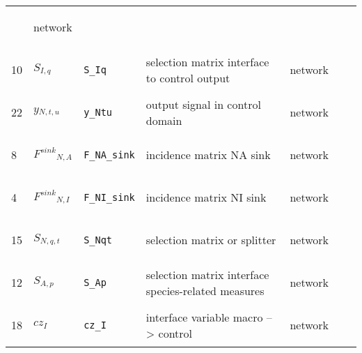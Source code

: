 \begin{longtable}{|p{1cm}|p{2.5cm}|p{4.5cm}|p{8cm}|p{3.0cm}|p{3cm}|p{1cm}|}
             & \begin{lay}network \end{lay}
             & $  $
             & \\
            10
             & \hypertarget{"v:10"}{ $ {{S}}{_{I, q}} $}
             & \verb|S_Iq|
             & selection matrix interface to control output
             & \begin{lay}network \end{lay}
             & $  $
             & \\
            22
             & \hypertarget{"v:22"}{ $ {{y}}{_{N, t, u}} $}
             & \verb|y_Ntu|
             & output signal in control domain
             & \begin{lay}network \end{lay}
             & $  $
             & \\
            8
             & \hypertarget{"v:8"}{ $ {{F^{sink}}}{_{N, A}} $}
             & \verb|F_NA_sink|
             & incidence matrix NA sink
             & \begin{lay}network \end{lay}
             & $  $
             & \\
            4
             & \hypertarget{"v:4"}{ $ {{F^{sink}}}{_{N, I}} $}
             & \verb|F_NI_sink|
             & incidence matrix NI sink
             & \begin{lay}network \end{lay}
             & $  $
             & \\
            15
             & \hypertarget{"v:15"}{ $ {{S}}{_{N, q, t}} $}
             & \verb|S_Nqt|
             & selection matrix or splitter
             & \begin{lay}network \end{lay}
             & $  $
             & \\
            12
             & \hypertarget{"v:12"}{ $ {{S}}{_{A, p}} $}
             & \verb|S_Ap|
             & selection matrix interface species-related measures
             & \begin{lay}network \end{lay}
             & $  $
             & \\
            18
             & \hypertarget{"v:18"}{ $ {{cz}}{_{I}} $}
             & \verb|cz_I|
             & interface variable macro --> control
             & \begin{lay}network \end{lay}

\end{longtable}
